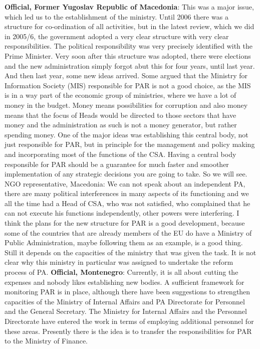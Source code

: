 \textbf{Official, Former Yugoslav Republic of Macedonia}: This was a major issue, which led us to the establishment of the ministry. Until 2006 there was a structure for co-ordination of all activities, but in the latest review, which we did in 2005/6, the government adopted a very clear structure with very clear responsibilities. The political responsibility was very precisely identified with the Prime Minister. Very soon after this structure was adopted, there were elections and the new administration simply forgot abut this for four years, until last year. And then last year, some new ideas arrived. Some argued that the Ministry for Information Society (MIS) responsible for PAR is not a good choice, as the MIS is in a way part of the economic group of ministries, where we have a lot of money in the budget. Money means possibilities for corruption and also money means that the focus of Heads would be directed to those sectors that have money and the administration as such is not a money generator, but rather spending money. One of the major ideas was establishing this central body, not just responsible for PAR, but in principle for the management and policy making and incorporating most of the functions of the CSA. Having a central body responsible for PAR should be a guarantee for much faster and smoother implementation of any strategic decisions you are going to take. So we will see.
NGO representative, Macedonia: We can not speak about an independent PA, there are many political interferences in many aspects of its functioning and we all the time had a Head of CSA, who was not satisfied, who complained that he can not execute his functions independently, other powers were interfering. I think the plans for the new structure for PAR is a good development, because some of the countries that are already members of the EU do have a Ministry of Public Administration, maybe following them as an example, is a good thing. Still it depends on the capacities of the ministry that was given the task. It is not clear why this ministry in particular was assigned to undertake the reform process of PA. 
\textbf{Official, Montenegro}: Currently, it is all about cutting the expenses and nobody likes establishing new bodies. A sufficient framework for monitoring PAR is in place, although there have been suggestions to strengthen capacities of the Ministry of Internal Affairs and PA Directorate for Personnel and the General Secretary. The Ministry for Internal Affairs and the Personnel Directorate have entered the work in terms of employing additional personnel for these areas. Presently there is the idea is to transfer the responsibilities for PAR to the Ministry of Finance.

